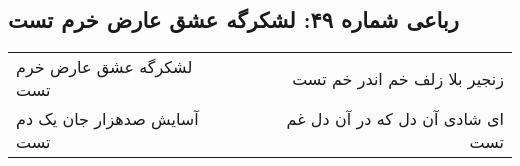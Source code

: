 \begin{center}
\section*{رباعی شماره ۴۹: لشکرگه عشق عارض خرم تست}
\label{sec:sh049}
\begin{longtable}{l p{0.5cm} r}
لشکرگه عشق عارض خرم تست
&&
زنجیر بلا زلف خم اندر خم تست
\\
آسایش صدهزار جان یک دم تست
&&
ای شادی آن دل که در آن دل غم تست
\\
\end{longtable}
\end{center}
